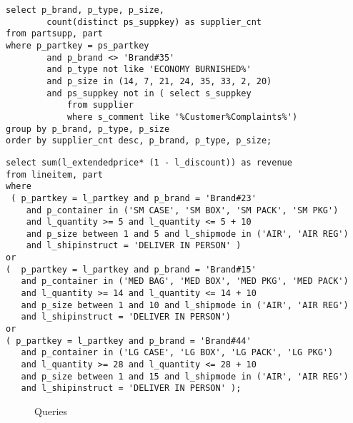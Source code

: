 \newsavebox{\secondlisting}
\begin{lrbox}{\secondlisting}%
\begin{lstlisting}
select p_brand, p_type, p_size,
        count(distinct ps_suppkey) as supplier_cnt
from partsupp, part
where p_partkey = ps_partkey
        and p_brand <> 'Brand#35'
        and p_type not like 'ECONOMY BURNISHED%'
        and p_size in (14, 7, 21, 24, 35, 33, 2, 20)
        and ps_suppkey not in ( select s_suppkey
            from supplier
            where s_comment like '%Customer%Complaints%')
group by p_brand, p_type, p_size
order by supplier_cnt desc, p_brand, p_type, p_size;

\end{lstlisting}
\end{lrbox}

\newsavebox{\thirdlisting}
\begin{lrbox}{\thirdlisting}%
\begin{lstlisting}
select sum(l_extendedprice* (1 - l_discount)) as revenue
from lineitem, part
where
 ( p_partkey = l_partkey and p_brand = 'Brand#23'
    and p_container in ('SM CASE', 'SM BOX', 'SM PACK', 'SM PKG')
    and l_quantity >= 5 and l_quantity <= 5 + 10
    and p_size between 1 and 5 and l_shipmode in ('AIR', 'AIR REG')
    and l_shipinstruct = 'DELIVER IN PERSON' )
or 
(  p_partkey = l_partkey and p_brand = 'Brand#15'
   and p_container in ('MED BAG', 'MED BOX', 'MED PKG', 'MED PACK')
   and l_quantity >= 14 and l_quantity <= 14 + 10
   and p_size between 1 and 10 and l_shipmode in ('AIR', 'AIR REG')
   and l_shipinstruct = 'DELIVER IN PERSON')
or 
( p_partkey = l_partkey and p_brand = 'Brand#44'
   and p_container in ('LG CASE', 'LG BOX', 'LG PACK', 'LG PKG')
   and l_quantity >= 28 and l_quantity <= 28 + 10
   and p_size between 1 and 15 and l_shipmode in ('AIR', 'AIR REG')
   and l_shipinstruct = 'DELIVER IN PERSON' );
\end{lstlisting}
\end{lrbox}

\begin{figure*}[ht]
\usebox{\measurebox}\qquad
\hspace{4em}
\begin{minipage}[b][\ht\measurebox][s]{.33\textwidth}
\subfloat[Q19]{\usebox{\thirdlisting}} 
\end{minipage}
\caption{ Queries}

\label{fig:queries}
\end{figure*}





